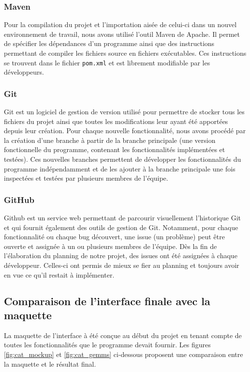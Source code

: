 \subsubsection{Maven}
Pour la compilation du projet et l'importation aisée de celui-ci dans un nouvel environnement de travail, nous avons utilisé l'outil Maven de Apache. Il permet de spécifier les dépendances d'un programme ainsi que des instructions permettant de compiler les fichiers source en fichiers exécutables. Ces instructions se trouvent dans le fichier \texttt{pom.xml} et est librement modifiable par les développeurs.


\subsubsection{Git}
Git est un logiciel de gestion de version utilisé pour permettre de stocker tous les fichiers du projet ainsi que toutes les modifications leur ayant été apportées depuis leur création. Pour chaque nouvelle fonctionnalité, nous avons procédé par la création d'une branche à partir de la branche principale (une version fonctionnelle du programme, contenant les fonctionnalités implémentées et testées). Ces nouvelles branches permettent de développer les fonctionnalités du programme indépendamment et de les ajouter à la branche principale une fois inspectées et testées par plusieurs membres de l'équipe.

\subsubsection{GitHub}
Github est un service web permettant de parcourir visuellement l'historique Git et qui fournit également des outils de gestion de Git. Notamment, pour chaque fonctionnalité ou chaque bug découvert, une \og{} issue \fg{} (un problème) peut être ouverte et assignée à un ou plusieurs membres de l'équipe. Dès la fin de l'élaboration du planning de notre projet, des issues ont été assignées à chaque développeur. Celles-ci ont permis de mieux se fier au planning et toujours avoir en vue ce qu'il restait à implémenter.

\subsection{Comparaison de l'interface finale avec la maquette}
La maquette de l'interface à été conçue au début du projet en tenant compte de toutes les fonctionnalités que le programme devait fournir. Les figures \ref{fig:cat_mockup} et \ref{fig:cat_gemms} ci-dessous proposent une comparaison entre la maquette et le résultat final.

